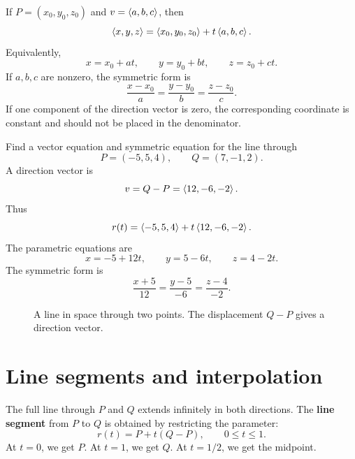 If $P=(x_0,y_0,z_0)$ and $v=\left\langle a,b,c\right\rangle$, then
\[
  \left\langle x,y,z\right\rangle=\left\langle x_0,y_0,z_0\right\rangle+t\left\langle a,b,c\right\rangle.
\]
Equivalently,
\[
  x=x_0+at,\qquad y=y_0+bt,\qquad z=z_0+ct.
\]
If $a,b,c$ are nonzero, the symmetric form is
\[
  \frac{x-x_0}{a}=\frac{y-y_0}{b}=\frac{z-z_0}{c}.
\]
If one component of the direction vector is zero, the corresponding coordinate is constant and should not be placed in the denominator.

\begin{examplebox}[title={Example 4.2: A line through two points}]
Find a vector equation and symmetric equation for the line through
\[
  P=(-5,5,4),\qquad Q=(7,-1,2).
\]
A direction vector is
\[
  v=Q-P=\left\langle 12,-6,-2\right\rangle.
\]
Thus
\[
  r(t)=\left\langle -5,5,4\right\rangle+t\left\langle 12,-6,-2\right\rangle.
\]
The parametric equations are
\[
  x=-5+12t,\qquad y=5-6t,\qquad z=4-2t.
\]
The symmetric form is
\[
  \frac{x+5}{12}=\frac{y-5}{-6}=\frac{z-4}{-2}.
\]
\end{examplebox}

\begin{figure}[H]
\centering
{}
\caption{A line in space through two points. The displacement $Q-P$ gives a direction vector.}
\end{figure}

\section{Line segments and interpolation}

The full line through $P$ and $Q$ extends infinitely in both directions. The \textbf{line segment} from $P$ to $Q$ is obtained by restricting the parameter:
\[
  r(t)=P+t(Q-P),\qquad 0\le t\le 1.
\]
At $t=0$, we get $P$. At $t=1$, we get $Q$. At $t=1/2$, we get the midpoint.

